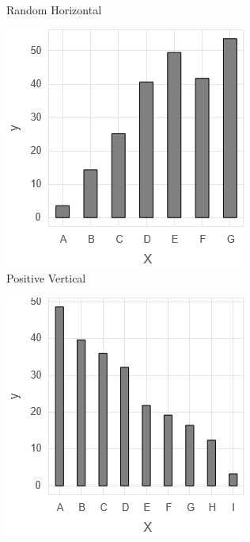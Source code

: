 \begin{figure}
\begin{subfigure}[b]{0.24\textwidth}
        \caption{Random Horizontal}
        \label{figure:random_horizontal_bar}
    \end{subfigure}
    \hfill
    \begin{subfigure}[b]{0.24\textwidth}
        \centering
        \includegraphics[width=\textwidth]{figures/body/methodology/pos_vertical_bar.png}
        \caption{Positive Vertical}
        \label{figure:pos_bar}
    \end{subfigure}
    \hfill
    \begin{subfigure}[b]{0.24\textwidth}
        \centering
        \includegraphics[width=\textwidth]{figures/body/methodology/neg_vertical_bar.png}

\end{subfigure}
\end{figure}
